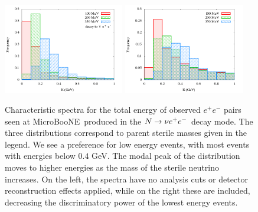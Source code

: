 \documentclass[11pt, a4paper]{article}
\def\muboone{MicroBooNE}
\def\ster{\ensuremath N}
\begin{document}
\begin{figure}[t]
%
\center
%
\includegraphics[width=0.47\textwidth]{figures/spectrum_ee_truth.png} \includegraphics[width=0.47\textwidth]{figures/spectrum_ee_truth_cuts.png}
%
\caption{\label{fig:spectrum_ee} Characteristic spectra for the total energy of observed  $e^+e^-$ pairs seen at \muboone\ produced in the $\ster \to \nu e^+e^-$ decay mode. The three distributions correspond to parent sterile masses given in the legend. We see a preference for low energy events, with most events with energies below $0.4$ GeV. The modal peak of the distribution moves to higher energies as the mass of the sterile neutrino increases. On the left, the spectra have no analysis cuts or detector reconstruction effects applied, while on the right these are included, decreasing the discriminatory power of the lowest energy events.}
%
\end{figure}
\end{document}
